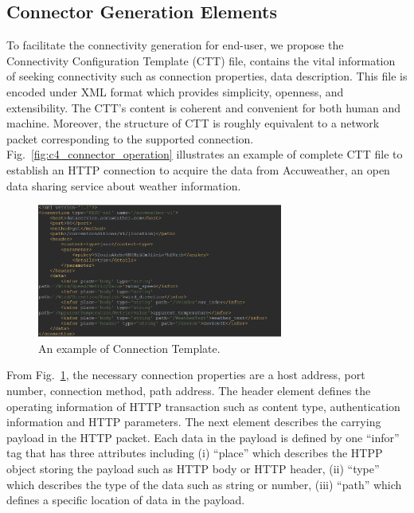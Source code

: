 \subsection{Connector Generation Elements}
To facilitate the connectivity generation for end-user, we propose the Connectivity Configuration Template (CTT) file, contains the vital information of seeking connectivity such as connection properties, data description. This file is encoded under XML format which provides simplicity, openness, and extensibility. The CTT’s content is coherent and convenient for both human and machine. Moreover, the structure of CTT is roughly equivalent to a network packet corresponding to the supported connection. Fig.~\ref{fig:c4_connector_operation} illustrates an example of complete CTT file to establish an HTTP connection to acquire the data from Accuweather, an open data sharing service about weather information.\\

\begin{figure}[h!] 
 \begin{center} 
 \includegraphics[width=0.72\textwidth]{./Part2/Chapter4/figures/connector_template.png} 
    \caption{An example of Connection Template.}
     \label{fig:c4_connector_template}
  \end{center} 
\end{figure}

From Fig.~\ref{fig:c4_connector_template}, the necessary connection properties are a host address, port number, connection method, path address. The header element defines the operating information of HTTP transaction such as content type, authentication information and HTTP parameters. The next element describes the carrying payload in the HTTP packet. Each data in the payload is defined by one “infor” tag that has three attributes including (i) “place” which describes the HTPP object storing the payload such as HTTP body or HTTP header, (ii) “type” which describes the type of the data such as string or number, (iii) “path” which defines a specific location of data in the payload.\\

